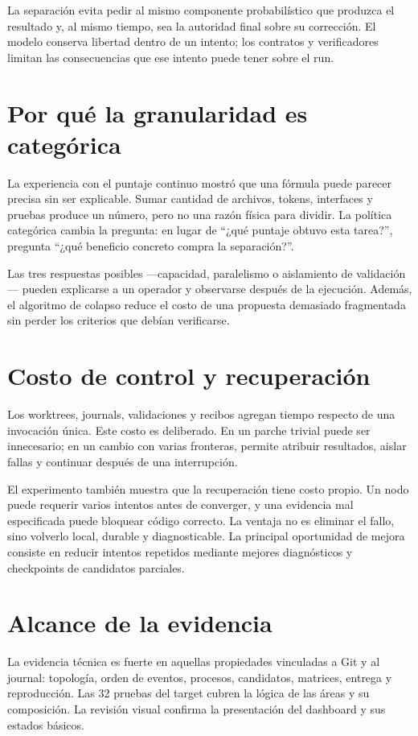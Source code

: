 La separación evita pedir al mismo componente probabilístico que produzca el
resultado y, al mismo tiempo, sea la autoridad final sobre su corrección. El
modelo conserva libertad dentro de un intento; los contratos y verificadores
limitan las consecuencias que ese intento puede tener sobre el run.

\section{Por qué la granularidad es categórica}

La experiencia con el puntaje continuo mostró que una fórmula puede parecer
precisa sin ser explicable. Sumar cantidad de archivos, tokens, interfaces y
pruebas produce un número, pero no una razón física para dividir. La política
categórica cambia la pregunta: en lugar de ``¿qué puntaje obtuvo esta tarea?'',
pregunta ``¿qué beneficio concreto compra la separación?''.

Las tres respuestas posibles —capacidad, paralelismo o aislamiento de
validación— pueden explicarse a un operador y observarse después de la
ejecución. Además, el algoritmo de colapso reduce el costo de una propuesta
demasiado fragmentada sin perder los criterios que debían verificarse.

\section{Costo de control y recuperación}

Los worktrees, journals, validaciones y recibos agregan tiempo respecto de una
invocación única. Este costo es deliberado. En un parche trivial puede ser
innecesario; en un cambio con varias fronteras, permite atribuir resultados,
aislar fallas y continuar después de una interrupción.

El experimento también muestra que la recuperación tiene costo propio. Un nodo
puede requerir varios intentos antes de converger, y una evidencia mal
especificada puede bloquear código correcto. La ventaja no es eliminar el
fallo, sino volverlo local, durable y diagnosticable. La principal oportunidad
de mejora consiste en reducir intentos repetidos mediante mejores diagnósticos
y checkpoints de candidatos parciales.

\section{Alcance de la evidencia}

La evidencia técnica es fuerte en aquellas propiedades vinculadas a Git y al
journal: topología, orden de eventos, procesos, candidatos, matrices, entrega y
reproducción. Las 32 pruebas del target cubren la lógica de las áreas y su
composición. La revisión visual confirma la presentación del dashboard y sus
estados básicos.

